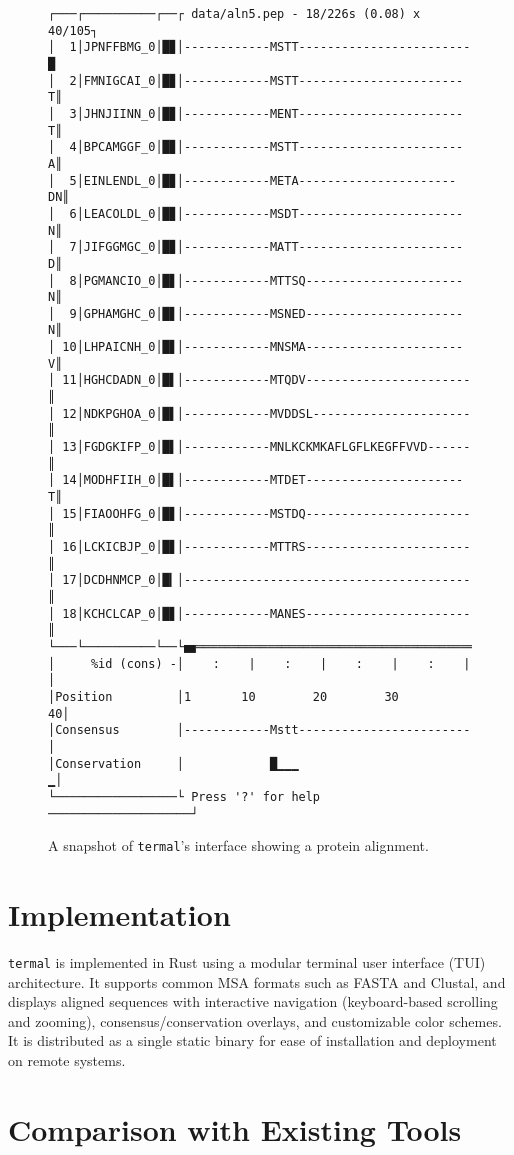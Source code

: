 \documentclass[11pt]{article}
\begin{document}
\begin{figure}[htbp]
\centering
\begin{Verbatim}[fontsize=\small]
┌───┌──────────┌──┌ data/aln5.pep - 18/226s (0.08) x 40/105┐
│  1│JPNFFBMG_0│█▊│------------MSTT------------------------█
│  2│FMNIGCAI_0│█▊│------------MSTT-----------------------T║
│  3│JHNJIINN_0│█▊│------------MENT-----------------------T║
│  4│BPCAMGGF_0│█▊│------------MSTT-----------------------A║
│  5│EINLENDL_0│█▊│------------META----------------------DN║
│  6│LEACOLDL_0│█▊│------------MSDT-----------------------N║
│  7│JIFGGMGC_0│█▊│------------MATT-----------------------D║
│  8│PGMANCIO_0│█▋│------------MTTSQ----------------------N║
│  9│GPHAMGHC_0│█▋│------------MSNED----------------------N║
│ 10│LHPAICNH_0│█▋│------------MNSMA----------------------V║
│ 11│HGHCDADN_0│█▌│------------MTQDV-----------------------║
│ 12│NDKPGHOA_0│█▌│------------MVDDSL----------------------║
│ 13│FGDGKIFP_0│█▌│------------MNLKCKMKAFLGFLKEGFFVVD------║
│ 14│MODHFIIH_0│█▌│------------MTDET----------------------T║
│ 15│FIAOOHFG_0│█▋│------------MSTDQ-----------------------║
│ 16│LCKICBJP_0│█▋│------------MTTRS-----------------------║
│ 17│DCDHNMCP_0│█▎│----------------------------------------║
│ 18│KCHCLCAP_0│█▋│------------MANES-----------------------║
└───└──────────└──└🬹═══════════════════════════════════════┘
│     %id (cons) -│    :    |    :    |    :    |    :    |│
│Position         │1       10        20        30        40│
│Consensus        │------------Mstt------------------------│
│Conservation     │            █▁▁▁                       ▁│
└─────────────────└ Press '?' for help ────────────────────┘
\end{Verbatim}
\caption{A snapshot of \texttt{termal}'s interface showing a protein alignment.}
\end{figure}


\section*{Implementation}

\texttt{termal} is implemented in Rust using a modular terminal user interface
(TUI) architecture. It supports common MSA formats such as FASTA and Clustal,
and displays aligned sequences with interactive navigation (keyboard-based
scrolling and zooming), consensus/conservation overlays, and customizable color
schemes. It is distributed as a single static binary for ease of installation
and deployment on remote systems.

\section*{Comparison with Existing Tools}
\end{document}
